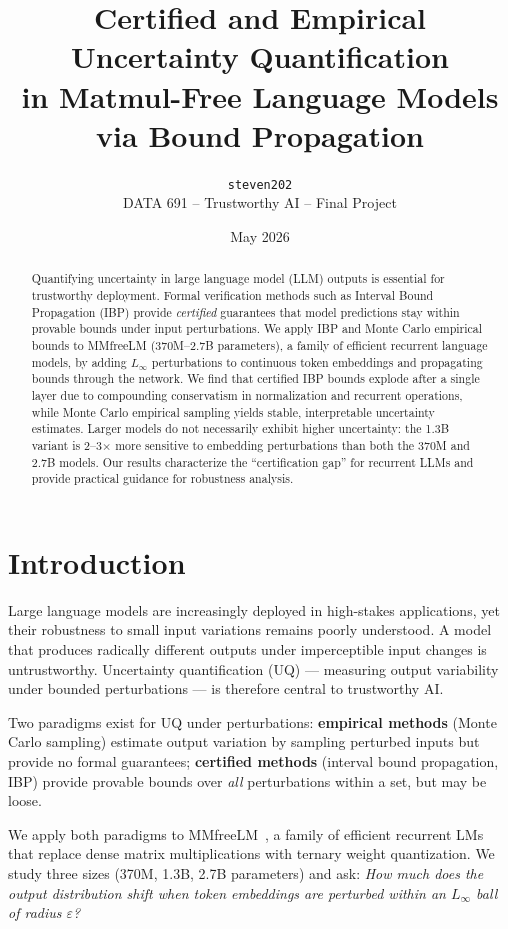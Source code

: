 \documentclass[11pt]{article}
\title{Certified and Empirical Uncertainty Quantification\\in Matmul-Free Language Models via Bound Propagation}
\author{%
    \texttt{steven202} \\
    DATA 691 -- Trustworthy AI -- Final Project
}
\date{May 2026}
\begin{document}
\maketitle

\begin{abstract}
Quantifying uncertainty in large language model (LLM) outputs is essential for trustworthy deployment. Formal verification methods such as Interval Bound Propagation (IBP) provide \emph{certified} guarantees that model predictions stay within provable bounds under input perturbations. We apply IBP and Monte Carlo empirical bounds to MMfreeLM (370M--2.7B parameters), a family of efficient recurrent language models, by adding $L_\infty$ perturbations to continuous token embeddings and propagating bounds through the network. We find that certified IBP bounds explode after a single layer due to compounding conservatism in normalization and recurrent operations, while Monte Carlo empirical sampling yields stable, interpretable uncertainty estimates. Larger models do not necessarily exhibit higher uncertainty: the 1.3B variant is 2--3$\times$ more sensitive to embedding perturbations than both the 370M and 2.7B models. Our results characterize the ``certification gap'' for recurrent LLMs and provide practical guidance for robustness analysis.
\end{abstract}

\section{Introduction}

Large language models are increasingly deployed in high-stakes applications, yet their robustness to small input variations remains poorly understood. A model that produces radically different outputs under imperceptible input changes is untrustworthy. Uncertainty quantification (UQ) --- measuring output variability under bounded perturbations --- is therefore central to trustworthy AI.

Two paradigms exist for UQ under perturbations: \textbf{empirical methods} (Monte Carlo sampling) estimate output variation by sampling perturbed inputs but provide no formal guarantees; \textbf{certified methods} (interval bound propagation, IBP) provide provable bounds over \emph{all} perturbations within a set, but may be loose.

We apply both paradigms to MMfreeLM~\cite{hgrn2024}, a family of efficient recurrent LMs that replace dense matrix multiplications with ternary weight quantization. We study three sizes (370M, 1.3B, 2.7B parameters) and ask: \emph{How much does the output distribution shift when token embeddings are perturbed within an $L_\infty$ ball of radius $\varepsilon$?}
\end{document}
